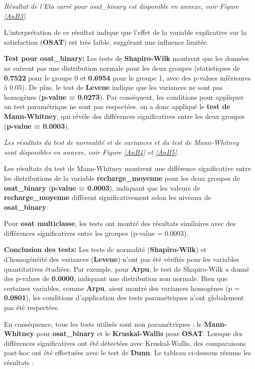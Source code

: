 \textit{Résultat de l'Eta carré pour osat\_binary est disponible en annexe, voir Figure \ref{AnB3}.}


L'interprétation de ce résultat indique que l'effet de la variable explicative sur la satisfaction (\textbf{OSAT}) est très faible, suggérant une influence limitée.

\textbf{\checkmark Test pour \textbf{osat\_binary}:} Les tests de \textbf{Shapiro-Wilk} montrent que les données ne suivent pas une distribution normale pour les deux groupes (statistiques de \textbf{0.7522} pour le groupe 0 et \textbf{0.6954} pour le groupe 1, avec des p-values inférieures à 0.05). De plus, le test de \textbf{Levene} indique que les variances ne sont pas homogènes (\textbf{p-value = 0.0273}). Par conséquent, les conditions pour appliquer un test paramétrique ne sont pas respectées. on a donc appliqué le \textbf{test de Mann-Whitney}, qui révèle des différences significatives entre les deux groupes (\textbf{p-value = 0.0003}). 


\textit{Les résultats du test de normalité et de variances et du test de Mann-Whitney sont disponibles en annexe, voir Figure \ref{AnB4} et \ref{AnB5}.}



Les résultats du test de Mann-Whitney montrent une différence significative entre les distributions de la variable \textbf{recharge\_moyenne} pour les deux groupes de \textbf{osat\_binary} (\textbf{p-value = 0.0003}), indiquant que les valeurs de \textbf{recharge\_moyenne} diffèrent significativement selon les niveaux de \textbf{osat\_binary}.

Pour \textbf{osat multiclasse}, les tests ont montré des résultats similaires avec des différences significatives entre les groupes (p-value = 0.0003).

\textbf{Conclusion des tests:} Les tests de normalité (\textbf{Shapiro-Wilk}) et d'homogénéité des variances (\textbf{Levene}) n'ont pas été vérifiés pour les variables quantitatives étudiées. Par exemple, pour \textbf{Arpu}, le test de Shapiro-Wilk a donné des p-values de \textbf{0.0000}, indiquant une distribution non normale. Bien que certaines variables, comme \textbf{Arpu}, aient montré des variances homogènes (p = \textbf{0.0801}), les conditions d'application des tests paramétriques n'ont globalement pas été respectées.

En conséquence, tous les tests utilisés sont non paramétriques : le \textbf{Mann-Whitney} pour \textbf{osat\_binary} et le \textbf{Kruskal-Wallis} pour \textbf{OSAT}. Lorsque des différences significatives ont été détectées avec Kruskal-Wallis, des comparaisons post-hoc ont été effectuées avec le test de \textbf{Dunn}. Le tableau ci-dessous résume les résultats :

